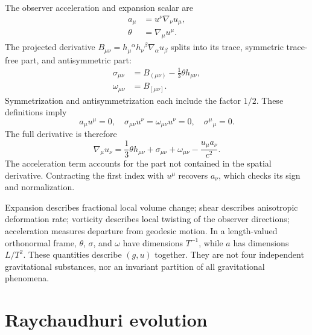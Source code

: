 \documentclass[11pt,oneside]{report}
\theoremstyle{remark}
\numberwithin{definition}{chapter}
\numberwithin{proposition}{chapter}
\numberwithin{remark}{chapter}
\begin{document}
The observer acceleration and expansion scalar are
\begin{align}
a_\mu&=u^\nu\nabla_\nu u_\mu,\label{geometry:eq:acceleration}\\
\theta&=\nabla_\mu u^\mu.\label{geometry:eq:expansion}
\end{align}
The projected derivative $B_{\mu\nu}=h_\mu{}^\alpha h_\nu{}^\beta\nabla_\alpha u_\beta$ splits into its trace, symmetric trace-free part, and antisymmetric part:
\begin{align}
\sigma_{\mu\nu}&=B_{(\mu\nu)}-\frac13\theta h_{\mu\nu},
\label{geometry:eq:shear}\\
\omega_{\mu\nu}&=B_{[\mu\nu]}.
\label{geometry:eq:vorticity}
\end{align}
Symmetrization and antisymmetrization each include the factor $1/2$. These definitions imply
\begin{equation}
a_\mu u^\mu=0,\quad \sigma_{\mu\nu}u^\nu=\omega_{\mu\nu}u^\nu=0,
\quad \sigma^\mu{}_{\mu}=0.
\label{geometry:eq:kinematicprops}
\end{equation}
The full derivative is therefore
\begin{equation}
\boxed{\nabla_\mu u_\nu=\frac13\theta h_{\mu\nu}
+\sigma_{\mu\nu}+\omega_{\mu\nu}-\frac{u_\mu a_\nu}{c^2}.}
\label{geometry:eq:flowdecomp}
\end{equation}
The acceleration term accounts for the part not contained in the spatial derivative. Contracting the first index with $u^\mu$ recovers $a_\nu$, which checks its sign and normalization.

Expansion describes fractional local volume change; shear describes anisotropic deformation rate; vorticity describes local twisting of the observer directions; acceleration measures departure from geodesic motion. In a length-valued orthonormal frame, $\theta$, $\sigma$, and $\omega$ have dimensions $T^{-1}$, while $a$ has dimensions $L/T^2$. These quantities describe $(g,u)$ together. They are not four independent gravitational substances, nor an invariant partition of all gravitational phenomena.

\section{Raychaudhuri evolution}
\end{document}
